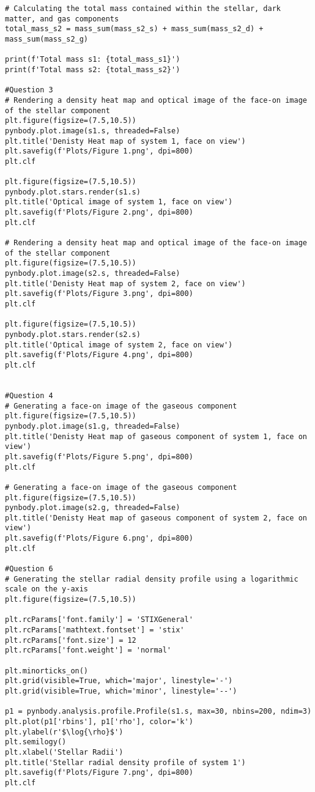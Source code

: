 \documentclass[12pt, a4paper]{article}
\begin{document}
\begin{lstlisting}[language=iPython]
# Calculating the total mass contained within the stellar, dark matter, and gas components
total_mass_s2 = mass_sum(mass_s2_s) + mass_sum(mass_s2_d) + mass_sum(mass_s2_g)
  
print(f'Total mass s1: {total_mass_s1}')
print(f'Total mass s2: {total_mass_s2}')
  
#Question 3
# Rendering a density heat map and optical image of the face-on image of the stellar component
plt.figure(figsize=(7.5,10.5))
pynbody.plot.image(s1.s, threaded=False)
plt.title('Denisty Heat map of system 1, face on view')
plt.savefig(f'Plots/Figure 1.png', dpi=800)
plt.clf
  
plt.figure(figsize=(7.5,10.5))
pynbody.plot.stars.render(s1.s)
plt.title('Optical image of system 1, face on view')
plt.savefig(f'Plots/Figure 2.png', dpi=800)
plt.clf
  
# Rendering a density heat map and optical image of the face-on image of the stellar component
plt.figure(figsize=(7.5,10.5))
pynbody.plot.image(s2.s, threaded=False)
plt.title('Denisty Heat map of system 2, face on view')
plt.savefig(f'Plots/Figure 3.png', dpi=800)
plt.clf
  
plt.figure(figsize=(7.5,10.5))
pynbody.plot.stars.render(s2.s)
plt.title('Optical image of system 2, face on view')
plt.savefig(f'Plots/Figure 4.png', dpi=800)
plt.clf
  
  
#Question 4
# Generating a face-on image of the gaseous component
plt.figure(figsize=(7.5,10.5))
pynbody.plot.image(s1.g, threaded=False)
plt.title('Denisty Heat map of gaseous component of system 1, face on view')
plt.savefig(f'Plots/Figure 5.png', dpi=800)
plt.clf
  
# Generating a face-on image of the gaseous component
plt.figure(figsize=(7.5,10.5))
pynbody.plot.image(s2.g, threaded=False)
plt.title('Denisty Heat map of gaseous component of system 2, face on view')
plt.savefig(f'Plots/Figure 6.png', dpi=800)
plt.clf
  
#Question 6
# Generating the stellar radial density profile using a logarithmic scale on the y-axis
plt.figure(figsize=(7.5,10.5))
  
plt.rcParams['font.family'] = 'STIXGeneral'
plt.rcParams['mathtext.fontset'] = 'stix'
plt.rcParams['font.size'] = 12
plt.rcParams['font.weight'] = 'normal'
  
plt.minorticks_on()
plt.grid(visible=True, which='major', linestyle='-')
plt.grid(visible=True, which='minor', linestyle='--')
  
p1 = pynbody.analysis.profile.Profile(s1.s, max=30, nbins=200, ndim=3)
plt.plot(p1['rbins'], p1['rho'], color='k')
plt.ylabel(r'$\log{\rho}$')
plt.semilogy()
plt.xlabel('Stellar Radii')
plt.title('Stellar radial density profile of system 1')
plt.savefig(f'Plots/Figure 7.png', dpi=800)
plt.clf
  

\end{lstlisting}
\end{document}

